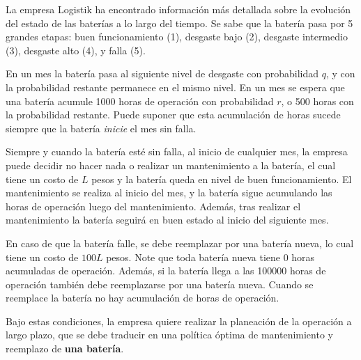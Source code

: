 \noindent La empresa Logistik ha encontrado información más detallada sobre la evolución del estado de las baterías a lo largo del tiempo. 
Se sabe que la batería pasa por 5 grandes etapas: buen funcionamiento (1), desgaste bajo (2), desgaste intermedio (3), desgaste alto (4), y falla (5). 

\noindent En un mes la batería pasa al siguiente nivel de desgaste con probabilidad $q$, y con la probabilidad restante permanece en el mismo nivel. 
\noindent En un mes se espera que una batería acumule 1000 horas de operación con probabilidad $r$, o 500 horas con la probabilidad restante. 
Puede suponer que esta acumulación de horas sucede siempre que la batería \emph{inicie} el mes sin falla. 

\noindent Siempre y cuando la batería esté sin falla, al inicio de cualquier mes, la empresa puede decidir no hacer nada o realizar un mantenimiento a la batería, el cual tiene un costo de $L$ pesos y la batería queda en nivel de buen funcionamiento. 
El mantenimiento se realiza al inicio del mes, y la batería sigue acumulando las horas de operación luego del mantenimiento. Además, tras realizar el mantenimiento la batería seguirá en buen estado al inicio del siguiente mes. 

\noindent En caso de que la batería falle, se debe reemplazar por una batería nueva, lo cual tiene un costo de $100L$ pesos. Note que toda batería nueva tiene 0 horas acumuladas de operación. Además, si la batería llega a las 100000 horas de operación también debe reemplazarse por una batería nueva. Cuando se reemplace la batería no hay acumulación de horas de operación. 

\noindent Bajo estas condiciones, la empresa quiere realizar la planeación de la operación a largo plazo, que se debe traducir en una política óptima de mantenimiento y reemplazo de \textbf{una batería}. 



